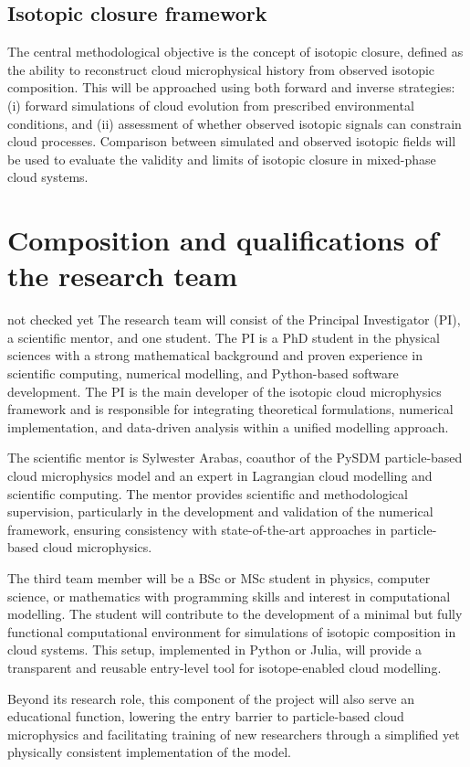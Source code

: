 \documentclass[12pt]{article}
\begin{document}
\subsection*{Isotopic closure framework}

The central methodological objective is the concept of isotopic closure, defined
as the ability to reconstruct cloud microphysical history from observed isotopic composition.
This will be approached using both forward and inverse strategies: 
(i) forward simulations of cloud evolution from prescribed environmental conditions, 
and (ii) assessment of whether observed isotopic signals can constrain cloud processes. 
Comparison between simulated and observed isotopic fields will be used to evaluate 
the validity and limits of isotopic closure in mixed-phase cloud systems.


\section{Composition and qualifications of the research team}
{\color{red}not checked yet}
The research team will consist of the Principal Investigator (PI), a scientific mentor, and one student.
The PI is a PhD student in the physical sciences with a strong mathematical background
and proven experience in scientific computing, numerical modelling, and Python-based software development.
The PI is the main developer of the isotopic cloud microphysics framework and
is responsible for integrating theoretical formulations, numerical implementation,
and data-driven analysis within a unified modelling approach.

The scientific mentor is Sylwester Arabas, coauthor of the PySDM particle-based cloud microphysics
model and an expert in Lagrangian cloud modelling and scientific computing.
The mentor provides scientific and methodological supervision, particularly in the development
and validation of the numerical framework, ensuring consistency with state-of-the-art approaches
in particle-based cloud microphysics.

The third team member will be a BSc or MSc student in physics, computer science,
or mathematics with programming skills and interest in computational modelling.
The student will contribute to the development of a minimal but fully functional
computational environment for simulations of isotopic composition in cloud systems.
This setup, implemented in Python or Julia, will provide a transparent and reusable 
entry-level tool for isotope-enabled cloud modelling.

Beyond its research role, this component of the project will also serve an educational function,
lowering the entry barrier to particle-based cloud microphysics and facilitating training
of new researchers through a simplified yet physically consistent implementation of the model.

\appendix

\clearpage
\printbibliography
\end{document}
